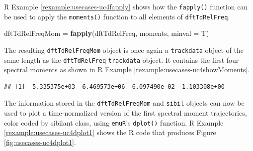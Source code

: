 \documentclass[]{book}
\newenvironment{Shaded}{\begin{snugshade}}{\end{snugshade}}
\newcommand{\CommentTok}[1]{\textcolor[rgb]{0.56,0.35,0.01}{\textit{#1}}}
\newcommand{\DataTypeTok}[1]{\textcolor[rgb]{0.13,0.29,0.53}{#1}}
\newcommand{\DecValTok}[1]{\textcolor[rgb]{0.00,0.00,0.81}{#1}}
\newcommand{\KeywordTok}[1]{\textcolor[rgb]{0.13,0.29,0.53}{\textbf{#1}}}
\newcommand{\NormalTok}[1]{#1}
\newcommand{\OperatorTok}[1]{\textcolor[rgb]{0.81,0.36,0.00}{\textbf{#1}}}
\newcommand{\OtherTok}[1]{\textcolor[rgb]{0.56,0.35,0.01}{#1}}
\newcommand{\StringTok}[1]{\textcolor[rgb]{0.31,0.60,0.02}{#1}}
\theoremstyle{definition}
\theoremstyle{definition}
\theoremstyle{definition}
\theoremstyle{remark}
\begin{document}
R Example \ref{rexample:usecases-uc4fapply} shows how the
\texttt{fapply()} function can be used to apply the \texttt{moments()}
function to all elements of \texttt{dftTdRelFreq}.

\begin{Shaded}
\begin{Highlighting}[]
\NormalTok{dftTdRelFreqMom =}\StringTok{ }\KeywordTok{fapply}\NormalTok{(dftTdRelFreq, moments, }\DataTypeTok{minval =}\NormalTok{ T)}
\end{Highlighting}
\end{Shaded}

The resulting \texttt{dftTdRelFreqMom} object is once again a
\texttt{trackdata} object of the same length as the
\texttt{dftTdRelFreq} \texttt{trackdata} object. It contains the first
four spectral moments as shown in R Example
\ref{rexample:usecases-uc4showMoments}.

\begin{Shaded}
\end{Shaded}

\begin{verbatim}
## [1]  5.335375e+03  6.469573e+06  6.097490e-02 -1.103308e+00
\end{verbatim}

The information stored in the \texttt{dftTdRelFreqMom} and
\texttt{sibil} objects can now be used to plot a time-normalized version
of the first spectral moment trajectories, color coded by sibilant
class, using \texttt{emuR}'s \texttt{dplot()} function. R Example
\ref{rexample:usecases-uc4dplot1} shows the R code that produces Figure
\ref{fig:usecases-uc4dplot1}.

\begin{Shaded}
\end{Shaded}
\end{document}
